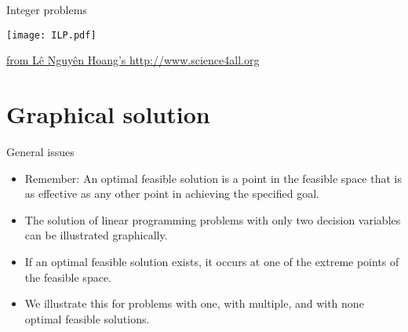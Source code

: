 \documentclass[c]{beamer}
\begin{document}
\begin{frame}[c]{Integer problems}

  \begin{center}
    \texttt{[image: ILP.pdf]}

    \href{http://www.science4all.org/article/integer-programming/}{from Lê Nguyên Hoang's http://www.science4all.org}
  \end{center}
\end{frame}

\section{Graphical solution}

\begin{frame}[c]{General issues}
  \begin{itemize}
    \item Remember: An optimal feasible solution is a point in the feasible space that is as effective as any other point in achieving the specified goal.
    \item The solution of linear programming problems with only two decision variables can be illustrated graphically.
    \item If an optimal feasible solution exists, it occurs at one of the extreme points of the feasible space.
    \item We illustrate this for problems with one, with multiple, and with none optimal feasible solutions.
  \end{itemize}
\end{frame}
\end{document}
